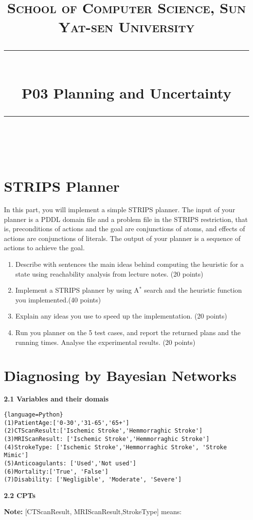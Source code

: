 \documentclass[a4paper, 11pt]{article}
\title{	
\normalfont \normalsize
\textsc{School of Computer Science, Sun Yat-sen University} \\ [25pt] %
\rule{\textwidth}{0.5pt} \\[0.4cm] %
\huge  P03 Planning and Uncertainty\\ %
\rule{\textwidth}{2pt} \\[0.5cm] %
\author{}
}
\begin{document}
\maketitle
\tableofcontents
\newpage
\section{STRIPS Planner}
In this part, you will implement a simple STRIPS planner. The input of your planner is a PDDL domain file and a problem file in the STRIPS restriction, that is, preconditions of actions and the goal are conjunctions of atoms, and effects of actions are conjunctions of literals. The output of your planner is a sequence of actions to achieve the goal.

\begin{enumerate}

\item Describe with sentences the main ideas behind computing the heuristic for a state using reachability analysis from lecture notes. (20 points)
    

\item Implement a STRIPS planner by using A$^*$ search and the heuristic function you implemented.(40 points)

\item Explain any ideas you use to speed up the implementation. (20 points)

\item Run you planner on the 5 test cases, and report the returned plans and the running times. Analyse the experimental results. (20 points)

\end{enumerate}


\section{Diagnosing by Bayesian Networks}
\textbf{2.1 Variables and their domais}
\begin{lstlisting}{language=Python}
(1)PatientAge:['0-30','31-65','65+']
(2)CTScanResult:['Ischemic Stroke','Hemmorraghic Stroke']
(3)MRIScanResult: ['Ischemic Stroke','Hemmorraghic Stroke']
(4)StrokeType: ['Ischemic Stroke','Hemmorraghic Stroke', 'Stroke Mimic']
(5)Anticoagulants: ['Used','Not used']
(6)Mortality:['True', 'False']
(7)Disability: ['Negligible', 'Moderate', 'Severe']
\end{lstlisting}
\textbf{2.2 CPTs}

\textbf{Note:} [CTScanResult, MRIScanResult,StrokeType] means:
\end{document}
